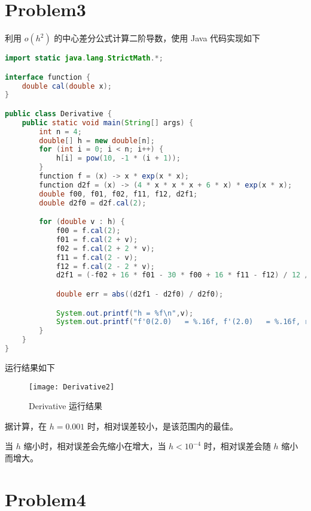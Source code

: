 \documentclass[UTF8]{ctexart}
\begin{document}
    \section{Problem3}\label{sec:3}
    利用 \(o(h^2)\) 的中心差分公式计算二阶导数，使用 Java 代码实现如下
    \begin{lstlisting}[language=Java, breaklines = true,label={lst:lstlisting3}]
import static java.lang.StrictMath.*;

interface function {
    double cal(double x);
}

public class Derivative {
    public static void main(String[] args) {
        int n = 4;
        double[] h = new double[n];
        for (int i = 0; i < n; i++) {
            h[i] = pow(10, -1 * (i + 1));
        }
        function f = (x) -> x * exp(x * x);
        function d2f = (x) -> (4 * x * x * x + 6 * x) * exp(x * x);
        double f00, f01, f02, f11, f12, d2f1;
        double d2f0 = d2f.cal(2);

        for (double v : h) {
            f00 = f.cal(2);
            f01 = f.cal(2 + v);
            f02 = f.cal(2 + 2 * v);
            f11 = f.cal(2 - v);
            f12 = f.cal(2 - 2 * v);
            d2f1 = (-f02 + 16 * f01 - 30 * f00 + 16 * f11 - f12) / 12 / v / v;

            double err = abs((d2f1 - d2f0) / d2f0);

            System.out.printf("h = %f\n",v);
            System.out.printf("f'0(2.0)   = %.16f, f'(2.0)   = %.16f, relative error = %.16f\n",d2f0, d2f1, err);
        }
    }
}
    \end{lstlisting}

    运行结果如下
    \begin{figure}[h]
        \centering
        \texttt{[image: Derivative2]}
        \caption{Derivative 运行结果}\label{fig:figure3}
    \end{figure}

    据计算，在 \(h = 0.001\) 时，相对误差较小，是该范围内的最佳。

    当 \(h\) 缩小时，相对误差会先缩小在增大，当 \(h < 10^{-4}\) 时，相对误差会随 \(h\) 缩小而增大。

    \newpage


    \section{Problem4}\label{sec:4}
\end{document}
